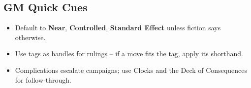 \subsection{GM Quick Cues}
\begin{itemize}
  \item Default to \textbf{Near}, \textbf{Controlled}, \textbf{Standard Effect} unless fiction says otherwise.
  \item Use tags as handles for rulings – if a move fits the tag, apply its shorthand.
  \item Complications escalate campaigns; use Clocks and the Deck of Consequences for follow‑through.
\end{itemize}